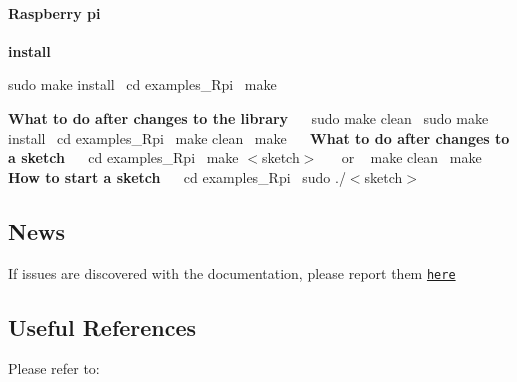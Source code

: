 \paragraph*{Raspberry pi}

{\bfseries install}~\newline
~\newline


sudo make install~\newline
 cd examples\+\_\+\+Rpi~\newline
 make~\newline
~\newline


{\bfseries What to do after changes to the library}~\newline
~\newline
 sudo make clean~\newline
 sudo make install~\newline
 cd examples\+\_\+\+Rpi~\newline
 make clean~\newline
 make~\newline
~\newline
 {\bfseries What to do after changes to a sketch}~\newline
~\newline
 cd examples\+\_\+\+Rpi~\newline
 make $<$sketch$>$~\newline
~\newline
 or ~\newline
 make clean~\newline
 make~\newline
~\newline
~\newline
 {\bfseries How to start a sketch}~\newline
~\newline
 cd examples\+\_\+\+Rpi~\newline
 sudo ./$<$sketch$>$~\newline
~\newline
\hypertarget{group__aeslib_AesNews}{}\subsection{News}\label{group__aeslib_AesNews}
If issues are discovered with the documentation, please report them \href{https://github.com/spaniakos/spaniakos.github.io/issues}{\tt here} \hypertarget{group__aeslib_AesUseful}{}\subsection{Useful References}\label{group__aeslib_AesUseful}
Please refer to\+:

